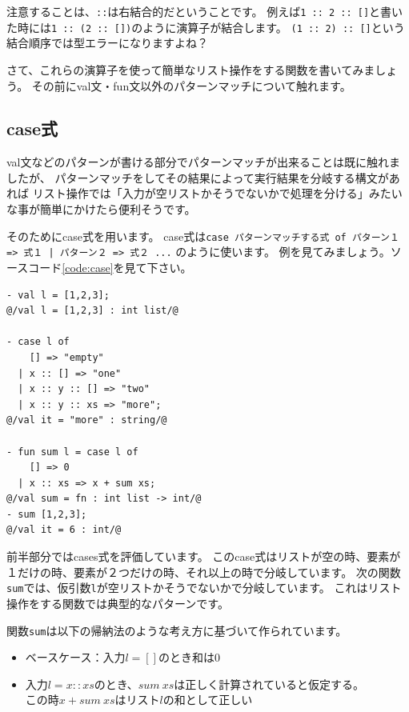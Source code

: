 \documentclass[11pt,a4paper]{article}
\begin{document}
注意することは、\lstinline{::}は右結合的だということです。
例えば\lstinline{1 :: 2 :: []}と書いた時には\lstinline{1 :: (2 :: [])}のように演算子が結合します。
\lstinline{(1 :: 2) :: []}という結合順序では型エラーになりますよね？

さて、これらの演算子を使って簡単なリスト操作をする関数を書いてみましょう。
その前にval文・fun文以外のパターンマッチについて触れます。

\subsection{case式}

val文などのパターンが書ける部分でパターンマッチが出来ることは既に触れましたが、
パターンマッチをしてその結果によって実行結果を分岐する構文があれば
リスト操作では「入力が空リストかそうでないかで処理を分ける」みたいな事が簡単にかけたら便利そうです。

そのためにcase式を用います。
case式は\lstinline{case パターンマッチする式 of パターン１ => 式１ | パターン２ => 式２ ...}
のように使います。
例を見てみましょう。ソースコード\ref{code:case}を見て下さい。

\begin{lstlisting}[caption=case式,label=code:case]
- val l = [1,2,3];
@/val l = [1,2,3] : int list/@

- case l of
    [] => "empty"
  | x :: [] => "one"
  | x :: y :: [] => "two"
  | x :: y :: xs => "more";
@/val it = "more" : string/@

- fun sum l = case l of
    [] => 0
  | x :: xs => x + sum xs;
@/val sum = fn : int list -> int/@
- sum [1,2,3];
@/val it = 6 : int/@
\end{lstlisting}

前半部分ではcases式を評価しています。
このcase式はリストが空の時、要素が１だけの時、要素が２つだけの時、それ以上の時で分岐しています。
次の関数\lstinline{sum}では、仮引数\lstinline{l}が空リストかそうでないかで分岐しています。
これはリスト操作をする関数では典型的なパターンです。

関数\lstinline{sum}は以下の帰納法のような考え方に基づいて作られています。
\begin{itemize}
\item ベースケース：入力$l = []$のとき和は0
\item 入力$l = x :: xs$のとき、$sum \ xs$は正しく計算されていると仮定する。\\
  この時$x + sum \ xs$はリスト$l$の和として正しい
\end{itemize}
\end{document}
